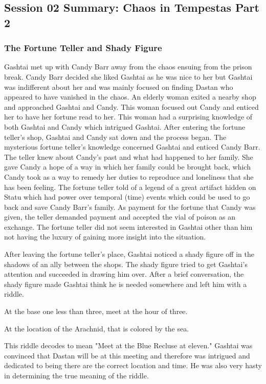 \subsection{Session 02 Summary: Chaos in Tempestas Part 2}

\subsubsection{The Fortune Teller and Shady Figure}

Gashtai met up with Candy Barr away from the chaos ensuing from the prison break. Candy Barr decided she liked Gashtai as he was nice to her but Gashtai was indifferent about her and was mainly focused on finding Dastan who appeared to have vanished in the chaos. An elderly woman exited a nearby shop and approached Gashtai and Candy. This woman focused out Candy and enticed her to have her fortune read to her. This woman had a surprising knowledge of both Gashtai and Candy which intrigued Gashtai. After entering the fortune teller's shop, Gashtai and Candy sat down and the process began. The mysterious fortune teller's knowledge concerned Gashtai and enticed Candy Barr. The teller knew about Candy's past and what had happened to her family. She gave Candy a hope of a way in which her family could be brought back, which Candy took as a way to remedy her duties to reproduce and loneliness that she has been feeling. The fortune teller told of a legend of a great artifact hidden on Statu which had power over temporal (time) events which could be used to go back and save Candy Barr's family. As payment for the fortune that Candy was given, the teller demanded payment and accepted the vial of poison as an exchange. The fortune teller did not seem interested in Gashtai other than him not having the luxury of gaining more insight into the situation.

After leaving the fortune teller's place, Gashtai noticed a shady figure off in the shadows of an ally between the shops. The shady figure tried to get Gashtai's attention and succeeded in drawing him over. After a brief conversation, the shady figure made Gashtai think he is needed somewhere and left him with a riddle.

\begin{center}
	At the base one less than three, meet at the hour of three.
	
	At the location of the Arachnid, that is colored by the sea.
\end{center}

This riddle decodes to mean "Meet at the Blue Recluse at eleven." Gashtai was convinced that Dastan will be at this meeting and therefore was intrigued and dedicated to being there are the correct location and time. He was also very hasty in determining the true meaning of the riddle. 

